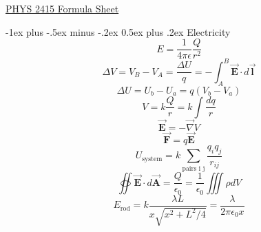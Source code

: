 \documentclass[12pt,landscape]{article}
\makeatletter
\renewcommand{\section}{\@startsection{section}{1}{0mm}%
                                {-1ex plus -.5ex minus -.2ex}%
                                {0.5ex plus .2ex}%
                                {\normalfont\large\bfseries}}
\makeatother
\begin{document}
\raggedright
\footnotesize
\begin{multicols}{4}

    \setlength{\premulticols}{1pt}
    \setlength{\postmulticols}{1pt}
    \setlength{\multicolsep}{1pt}
    \setlength{\columnsep}{2pt}
    \setlength{\mathindent}{0pt}
    \newcommand{\overbar}[1]{\mkern 1.5mu\overline{\mkern-1.5mu#1\mkern-1.5mu}\mkern 1.5mu}

    \begin{center}
        \Large{\underline{PHYS 2415 Formula Sheet}} \\
    \end{center}

    \section{Electricity}
    \begin{equation*}
        E = \frac{1}{4 \pi \epsilon} \frac{Q}{r^2}
    \end{equation*}
    \begin{equation*}
        \Delta V = V_B - V_A = \frac{\Delta U}{q} = -\int_{A}^{B} \vec{\mathbf{E}} \cdot d\vec{\mathbf{l}}
    \end{equation*}
    \begin{equation*}
        \Delta U = U_b - U_a = q(V_b - V_a)
    \end{equation*}
    \begin{equation*}
        V = k\frac{Q}{r} = k \int \frac{dq}{r}
    \end{equation*}
    \begin{equation*}
        \vec{\mathbf{E}} = - \vec{\nabla} V
    \end{equation*}
    \begin{equation*}
        \vec{\mathbf{F}} = q\vec{\mathbf{E}}
    \end{equation*}
    \begin{equation*}
        U_{\text{system}} = k \sum_{\text{pairs i j}} \frac{q_i q_j}{r_{ij}}
    \end{equation*}
    \begin{equation*}
        \oiint \vec{\mathbf{E}} \cdot d \vec{\mathbf{A}} = \frac{Q}{\epsilon_0} = \frac{1}{\epsilon_0} \iiint \rho dV
    \end{equation*}
    \begin{equation*}
        E_{\text{rod}} = k \frac{\lambda L}{x \sqrt{x^2 + L^2 / 4}} = \frac{\lambda}{2\pi \epsilon_0 x }

\end{equation*}
\end{multicols}
\end{document}

